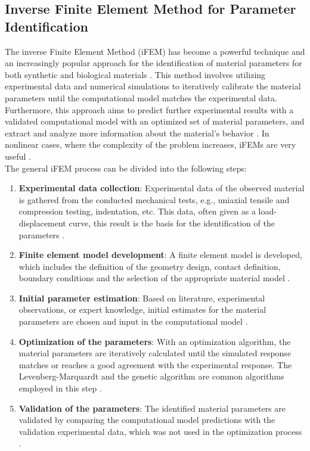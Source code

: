 \subsection{Inverse Finite Element Method for Parameter Identification}
\label{subsection:inverseFEMtheory}

The inverse Finite Element Method (iFEM) has become a powerful technique and an increasingly 
popular approach for the identification of material parameters for both synthetic and biological materials \cite{Liu2009}. 
This method involves utilizing experimental data and numerical simulations to iteratively calibrate 
the material parameters until the computational model matches the experimental data. 
Furthermore, this approach aims to predict further experimental results with a validated computational model 
with an optimized set of material parameters, and extract and analyze more information about the material's behavior \cite{Kauer2002}.
In nonlinear cases, where the complexity of the problem increases, iFEMs are very useful \cite{Husain2004}.\\

The general iFEM process can be divided into the following steps:

\begin{enumerate}
        \item \textbf{Experimental data collection}: Experimental data of the observed material is gathered from the conducted mechanical tests, e.g., uniaxial tensile and compression testing, indentation, etc. This data, often given as a load-displacement curve, this result is the basis for the identification of the parameters \cite{Seshaiyer2003}.
        \item \textbf{Finite element model development}: A finite element model is developed, which includes the definition of the geometry design, contact definition, boundary conditions and the selection of the appropriate material model \cite{Jamal2019}.
        \item \textbf{Initial parameter estimation}: Based on literature, experimental observations, or expert knowledge, initial estimates for the material parameters are chosen and input in the computational model \cite{Chawla2009}.
        \item \textbf{Optimization of the parameters}: With an optimization algorithm, the material parameters are iteratively calculated until the simulated response matches or reaches a good agreement with the experimental response. The Levenberg-Marquardt and the genetic algorithm are common algorithms employed in this step \cite{Kauer2002}.
        \item \textbf{Validation of the parameters}: The identified material parameters are validated by comparing the computational model predictions with the validation experimental data, which was not used in the optimization process \cite{Seshaiyer2003}.
\end{enumerate}

